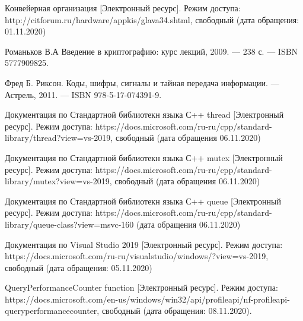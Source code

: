 \documentclass[12pt]{report}
\begin{document}
	\begin{thebibliography}{2}
		
		
		
		 Конвейерная организация [Электронный ресурс]. Режим доступа: 
		http://citforum.ru/hardware/appkis/glava34.shtml, 
		свободный (дата обращения: 01.11.2020)
		
		 Романьков В.А Введение в криптографию: курс лекций, 2009. — 238 с. — ISBN 5777909825.
		
		 Фред Б. Риксон. Коды, шифры, сигналы и тайная передача информации. — Астрель, 2011. — ISBN 978-5-17-074391-9.
		
		 Документация по Стандартной библиотекн языка С++ thread [Электронный ресурс]. Режим доступа: https://docs.microsoft.com/ru-ru/cpp/standard-library/thread?view=vs-2019, свободный (дата обращения 06.11.2020)
		
		 Документация по Стандартной библиотекн языка С++ mutex [Электронный ресурс]. Режим доступа: https://docs.microsoft.com/ru-ru/cpp/standard-library/mutex?view=vs-2019, свободный (дата обращения 06.11.2020)
		
		 Документация по Стандартной библиотекн языка С++ queue [Электронный ресурс]. Режим доступа: https://docs.microsoft.com/ru-ru/cpp/standard-library/queue-class?view=msvc-160
		(дата обращения 06.11.2020)
		
		 Документация по Visual Studio 2019 [Электронный ресурс]. Режим доступа: https://docs.microsoft.com/ru-ru/visualstudio/windows/?view=vs-2019, свободный (дата обращения: 05.11.2020)	
		
		 QueryPerformanceCounter function [Электронный ресурс]. Режим доступа: https://docs.microsoft.com/en-us/windows/win32/api/profileapi/nf-profileapi-queryperformancecounter, свободный (дата обращения: 08.11.2020).
	\end{thebibliography}
\end{document}
